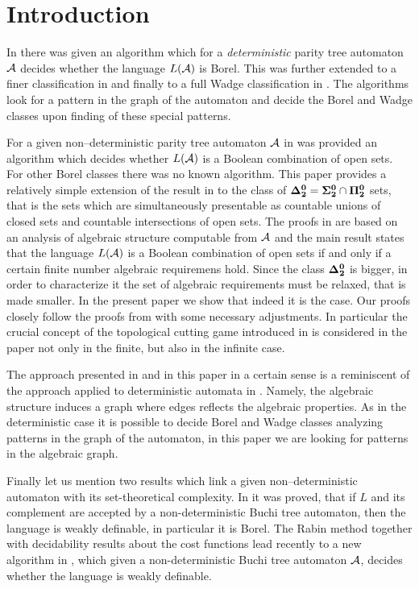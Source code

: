 \section{Introduction}
In \cite{niwalu} there was given an algorithm which for a \emph{deterministic} parity tree automaton ${\mathcal A}$ decides whether the language $L({\mathcal A})$ is Borel. This was further extended to a finer classification in \cite{niwalu2} and finally to a full Wadge classification in \cite{murlak}. The algorithms look for a pattern in the graph of the automaton and decide the Borel and Wadge classes upon finding of these special patterns. 

For a given non--deterministic parity tree automaton ${\mathcal A}$ in \cite{bp} was provided an algorithm which decides
whether $L({\mathcal A})$ is a Boolean combination of open sets. For other Borel classes there was no known algorithm. This paper provides a relatively simple extension 
of the result in \cite{bp} to the class of ${\bf \Delta^0_2} = {\bf\Sigma^0_2}\cap{\bf\Pi^0_2}$ sets, that is the sets which are simultaneously presentable as countable unions of closed sets and countable intersections of open sets. The proofs in \cite{bp} are based on an analysis of algebraic structure computable from ${\mathcal A}$ and the main result states that the language $L({\mathcal A})$ is a Boolean combination of open sets if and only if a certain finite number algebraic requiremens hold. Since the class ${\bf \Delta^0_2}$ is bigger, in order to characterize it the set of algebraic requirements must be relaxed, that is made smaller. In the present paper we show that indeed it is the case. Our proofs closely follow the proofs from \cite{bp} with some necessary adjustments. In particular the crucial concept of the topological cutting game introduced in \cite{bp} is considered in the paper not only in the finite, but also in the infinite case. 

The approach presented in \cite{bp} and in this paper in a certain sense is a reminiscent of the approach applied to deterministic automata in \cite{niwalu,niwalu2,murlak}. Namely, the algebraic structure induces a graph where edges reflects the algebraic properties. As in the deterministic case it is possible to decide Borel and Wadge classes analyzing patterns in the graph of the automaton, in this paper we are looking for patterns in the algebraic graph. 

Finally let us mention two results which link a given non--deterministic automaton with its set-theoretical complexity. In \cite{rabin} it was proved, that if $L$ and its complement are accepted by a non-deterministic Buchi tree automaton, then the language is weakly definable, in particular it is Borel. The Rabin method together with decidability results about the cost functions lead recently to a new algorithm in \cite{cklvb}, which given a non-deterministic Buchi tree automaton ${\mathcal A}$, decides whether the language is weakly definable. 
